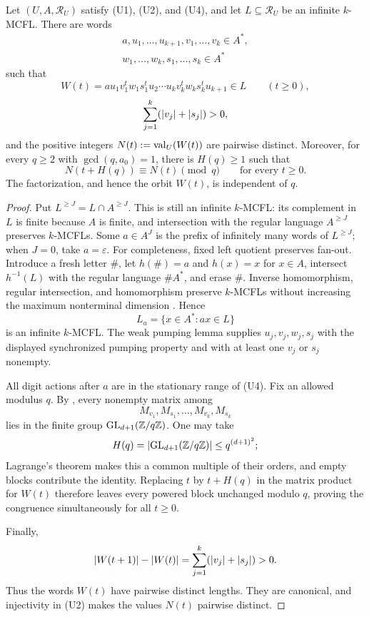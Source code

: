 \begin{theorem}
  \label{thm:mcfl-synchronized-congruence-orbit}
  Let \((U,A,\mathcal R_U)\) satisfy \textup{(U1)}, \textup{(U2)}, and
  \textup{(U4)}, and let
  \(L\subseteq\mathcal R_U\) be an infinite \(k\)-MCFL. There are words
  \[
    \begin{gathered}
      a,u_1,\ldots,u_{k+1},v_1,\ldots,v_k\in A^\ast,\\
      w_1,\ldots,w_k,s_1,\ldots,s_k\in A^\ast
    \end{gathered}
  \]
  such that
  \[
    W(t)=a u_1v_1^tw_1s_1^tu_2\cdots
          u_kv_k^tw_ks_k^tu_{k+1}\in L
          \qquad(t\ge0),
  \]
  \[
    \sum_{j=1}^k(\lvert v_j \rvert+\lvert s_j \rvert)>0,
  \]
  and the positive integers \(N(t):=\operatorname{val}_U(W(t))\) are pairwise distinct.
  Moreover, for
  every \(q\ge2\) with \(\gcd(q,a_0)=1\), there is \(H(q)\ge1\) such
  that
  \[
    N(t+H(q))\equiv N(t)\pmod q
    \qquad\text{for every }t\ge0.
  \]
  The factorization, and hence the orbit \(W(t)\), is independent of
  \(q\).
\end{theorem}

\begin{proof}
  Put \(L^{\ge J}=L\cap A^{\ge J}\). This is still an infinite
  \(k\)-MCFL: its complement in \(L\) is finite because \(A\) is finite,
  and intersection with the regular language \(A^{\ge J}\) preserves
  \(k\)-MCFLs. Some \(a\in A^J\) is the prefix of infinitely many words
  of \(L^{\ge J}\); when \(J=0\), take \(a=\varepsilon\). For completeness,
  fixed left quotient preserves fan-out. Introduce a fresh letter \(\#\),
  let \(h(\#)=a\) and \(h(x)=x\) for \(x\in A\), intersect
  \(h^{-1}(L)\) with the regular language \(\#A^*\), and erase \(\#\).
  Inverse homomorphism, regular intersection, and homomorphism preserve
  \(k\)-MCFLs without increasing the maximum nonterminal dimension
  \cite[Proposition~2.3]{DuncanElderFrenkelLiu2026}. Hence
  \[
    L_a=\{x\in A^\ast:ax\in L\}
  \]
  is an infinite \(k\)-MCFL. The weak pumping lemma supplies
  \(u_j,v_j,w_j,s_j\) with the displayed synchronized pumping property
  and with at least one \(v_j\) or \(s_j\) nonempty.

  All digit actions after \(a\) are in the stationary range of
  \textup{(U4)}. Fix an allowed modulus \(q\). By
  , every nonempty matrix among
  \[
    M_{v_1},M_{s_1},\ldots,M_{v_k},M_{s_k}
  \]
  lies in the finite group
  \(\operatorname{GL}_{d+1}(\mathbb{Z}/q\mathbb{Z})\). One may take
  \[
    H(q)=\lvert \operatorname{GL}_{d+1}(\mathbb{Z}/q\mathbb{Z}) \rvert
      \le q^{(d+1)^2};
  \]
  Lagrange's theorem makes this a common multiple of their orders, and
  empty blocks contribute the identity.
  Replacing \(t\) by \(t+H(q)\) in the matrix product for \(W(t)\)
  therefore leaves every powered block unchanged modulo \(q\), proving
  the congruence simultaneously for all \(t\ge0\).

  Finally,
  \[
    \lvert W(t+1) \rvert-\lvert W(t) \rvert
      =\sum_{j=1}^k(\lvert v_j \rvert+\lvert s_j \rvert)>0.
  \]
  Thus the words \(W(t)\) have pairwise distinct lengths. They are
  canonical, and injectivity in \textup{(U2)} makes the values \(N(t)\)
  pairwise distinct.
\end{proof}

